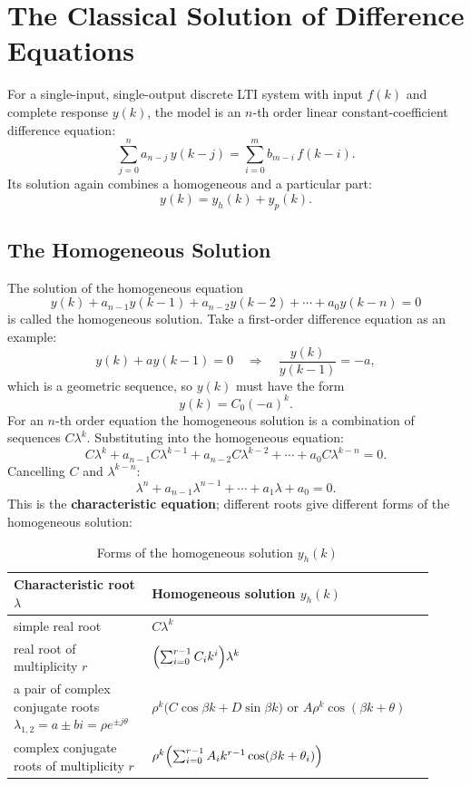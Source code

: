 \section{The Classical Solution of Difference Equations}

For a single-input, single-output discrete LTI system with input $f(k)$ and
complete response $y(k)$, the model is an $n$-th order linear
constant-coefficient difference equation:
\[
    \sum_{j=0}^{n}a_{n-j}\,y(k-j)=\sum_{i=0}^{m}b_{m-i}\,f(k-i).
\]
Its solution again combines a homogeneous and a particular part:
\[
    y(k)=y_h(k)+y_p(k).
\]

\subsection{The Homogeneous Solution}

The solution of the homogeneous equation
\[
    y(k)+a_{n-1}y(k-1)+a_{n-2}y(k-2)+\cdots+a_0y(k-n)=0
\]
is called the homogeneous solution. Take a first-order difference equation as
an example:
\[
    y(k)+ay(k-1)=0
    \quad\Longrightarrow\quad
    \frac{y(k)}{y(k-1)}=-a,
\]
which is a geometric sequence, so $y(k)$ must have the form
\[
    y(k)=C_0(-a)^{k}.
\]
For an $n$-th order equation the homogeneous solution is a combination of
sequences $C\lambda^{k}$. Substituting into the homogeneous equation:
\[
    C\lambda^{k}+a_{n-1}C\lambda^{k-1}+a_{n-2}C\lambda^{k-2}+\cdots+a_0C\lambda^{k-n}=0 .
\]
Cancelling $C$ and $\lambda^{k-n}$:
\[
    \lambda^{n}+a_{n-1}\lambda^{n-1}+\cdots+a_1\lambda+a_0=0 .
\]
This is the \textbf{characteristic equation}; different roots give different
forms of the homogeneous solution:

\begin{table}[htbp]
\centering
\caption{Forms of the homogeneous solution $y_h(k)$}
\small
\begin{tabular}{@{}p{0.30\linewidth}p{0.62\linewidth}@{}}
\toprule
Characteristic root $\lambda$ & Homogeneous solution $y_h(k)$ \\
\midrule
simple real root & $C\lambda^{k}$ \\
real root of multiplicity $r$ & $\Bigl(\sum_{i=0}^{r-1}C_i k^{i}\Bigr)\lambda^{k}$ \\
a pair of complex conjugate roots $\lambda_{1,2}=a\pm bi=\rho e^{\pm j\theta}$ &
$\rho^{k}\bigl(C\cos\beta k+D\sin\beta k\bigr)$ or $A\rho^{k}\cos(\beta k+\theta)$ \\
complex conjugate roots of multiplicity $r$ &
$\rho^{k}\Bigl(\sum_{i=0}^{r-1}A_i k^{r-1}\cos(\beta k+\theta_i)\Bigr)$ \\
\bottomrule
\end{tabular}
\end{table}

